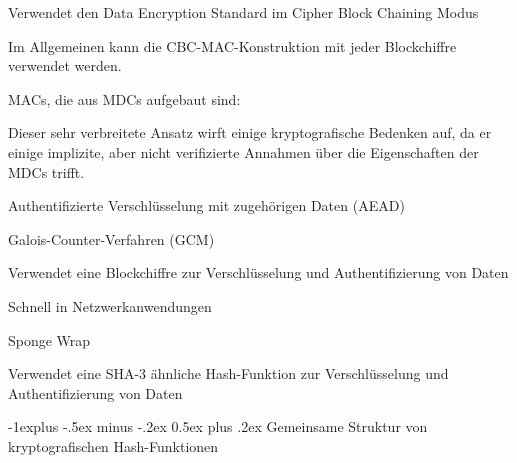 \documentclass[a4paper]{article}
\makeatletter
\renewcommand{\subsection}{\@startsection{subsection}{2}{0mm}%
 {-1explus -.5ex minus -.2ex}%
 {0.5ex plus .2ex}%
 {\normalfont\normalsize\bfseries}}
\makeatother
\begin{document}
\begin{multicols}{3}
\begin{itemize*}
\begin{itemize*}
                  \begin{itemize*} \item Verwendet den Data Encryption Standard im Cipher Block Chaining Modus \item Im Allgemeinen kann die CBC-MAC-Konstruktion mit jeder Blockchiffre verwendet werden. \end{itemize*}
                  \item MACs, die aus MDCs aufgebaut sind:
                  \begin{itemize*} \item Dieser sehr verbreitete Ansatz wirft einige kryptografische Bedenken auf, da er einige implizite, aber nicht verifizierte Annahmen über die Eigenschaften der MDCs trifft. \end{itemize*}
            \end{itemize*}
            \item Authentifizierte Verschlüsselung mit zugehörigen Daten (AEAD)
            \begin{itemize*}
                  \item Galois-Counter-Verfahren (GCM)
                  \begin{itemize*} \item Verwendet eine Blockchiffre zur Verschlüsselung und Authentifizierung von Daten \item Schnell in Netzwerkanwendungen \end{itemize*}
                  \item Sponge Wrap
                  \begin{itemize*} \item Verwendet eine SHA-3 ähnliche Hash-Funktion zur Verschlüsselung und Authentifizierung von Daten \end{itemize*}
            \end{itemize*}
      \end{itemize*}


      \subsection{Gemeinsame Struktur von kryptografischen
            Hash-Funktionen}


\end{multicols}
\end{document}

